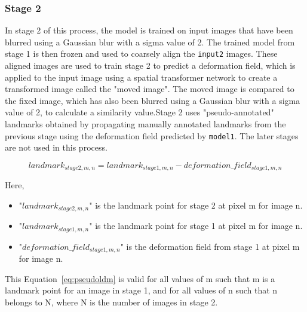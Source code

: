 \documentclass{report}
\begin{document}
	\subsubsection{Stage 2}
	In stage 2 of this process, the model is trained on input images that have been blurred using a Gaussian blur with a sigma value of 2. The trained model from stage 1 is then frozen and used to coarsely align the \texttt{input2} images. These aligned images are used to train stage 2 to predict a deformation field, which is applied to the input image using a spatial transformer network to create a transformed image called the "moved image". The moved image is compared to the fixed image, which has also been blurred using a Gaussian blur with a sigma value of 2, to calculate a similarity value.Stage 2 uses "pseudo-annotated" landmarks obtained by propagating manually annotated landmarks from the previous stage using the deformation field predicted by \texttt{model1}. The later stages are not used in this process.
	
	\begin{equation}\label{eq:pseudoldm}
		landmark_{stage2,m,n} = landmark_{stage1,m,n} - deformation\_field_{stage1,m,n}
	\end{equation}
	
	Here, 
	\begin{itemize}
		\item "$landmark_{stage2,m,n}$" is the landmark point for stage 2 at pixel m for image n.
		\item "$landmark_{stage1,m,n}$" is the landmark point for stage 1 at pixel m for image n.
		\item "$deformation\_field_{stage1,m,n}$" is the deformation field from stage 1 at pixel m for image n.    
	\end{itemize}
	
	This Equation~\ref{eq:pseudoldm} is valid for all values of m such that m is a landmark point for an image in stage 1, and for all values of n such that n belongs to N, where N is the number of images in stage 2.
\end{document}
